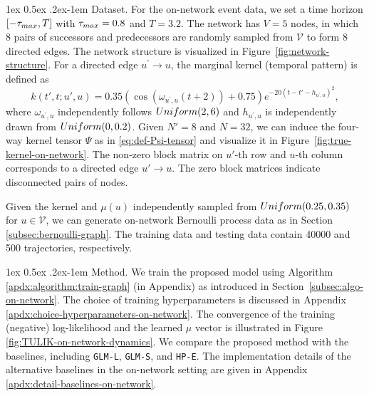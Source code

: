 \documentclass[11pt]{article}
\makeatletter
\theoremstyle{remark}
\theoremstyle{plain}
\newcommand{\calV}{\mathcal{V}}
\newcommand{\Unif}{\rm{Uniform}}
\renewcommand{\paragraph}{%
  \@startsection{paragraph}{4}%
  {\z@}{1ex \@plus 0.5ex \@minus .2ex}{-1em}%
  {\normalfont\normalsize\itshape}%
}
\makeatother
\begin{document}
\paragraph{Dataset.} For the on-network event data, we set a time horizon $[-\tau_{\rm max}, T]$ with $\tau_{\rm max}=0.8$ and $T = 3.2$. The network has $V=5$ nodes, in which 8 pairs of successors and predecessors are randomly sampled from $\calV$ to form 8 directed edges. The network structure is visualized in Figure~\ref{fig:network-structure}. For a directed edge $u^\prime \rightarrow u$, the marginal kernel (temporal pattern) is defined as 
\begin{equation}
\label{eq:on-network-kernel}
k(t',t;u',u) = 0.35\left(\cos\left(\omega_{u^\prime, u}(t+2)\right)+0.75\right)e^{-20\left(t-t'-h_{u^\prime,u}\right)^2},
\end{equation}
where $\omega_{u^\prime, u}$ independently follows $\Unif(2,6)$ and $h_{u^\prime, u}$ is independently drawn from $\Unif(0,0.2)$. Given $N'=8$ and $N=32$, we can induce the four-way kernel tensor $\Psi$ as in \eqref{eq:def-Psi-tensor} and visualize it in Figure~\ref{fig:true-kernel-on-network}. The non-zero block matrix on $u'$-th row and $u$-th column corresponds to a directed edge $u'\to u$. The zero block matrices indicate disconnected pairs of nodes. 

Given the kernel and $\mu(u)$ independently sampled from $\Unif(0.25,0.35)$ for $u\in\calV$, we can generate on-network Bernoulli process data as in Section \ref{subsec:bernoulli-graph}. The training data and testing data contain 40000 and 500 trajectories, respectively.



\paragraph{Method.} 
We train the proposed model using Algorithm \ref{apdx:algorithm:train-graph} (in Appendix) as introduced in Section~\ref{subsec:algo-on-network}. The choice of training hyperparameters is discussed in Appendix \ref{apdx:choice-hyperparameters-on-network}.
The convergence of the training (negative) log-likelihood and the learned $\mu$ vector is illustrated in Figure \ref{fig:TULIK-on-network-dynamics}. 
%
We compare the proposed method with the baselines, including \texttt{GLM-L}, \texttt{GLM-S}, and \texttt{HP-E}. The implementation details of the alternative baselines in the on-network setting are given in Appendix \ref{apdx:detail-baselines-on-network}. 
\end{document}
